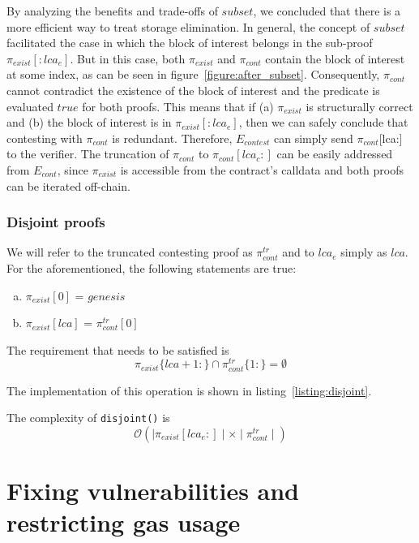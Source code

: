 By analyzing the benefits and trade-offs of $subset$, we concluded that there
is a more efficient way to treat storage elimination. In general, the concept
of $subset$ facilitated the case in which the block of interest belongs in the
sub-proof $\pi_{exist}[:lca_{e}]$. But in this case, both $\pi_{exist}$ and
$\pi_{cont}$ contain the block of interest at some index, as can be seen in
figure~\ref{figure:after_subset}. Consequently, $\pi_{cont}$ cannot contradict
the existence of the block of interest and the predicate is evaluated $true$
for both proofs. This means that if (a) $\pi_{exist}$ is structurally correct
and (b) the block of interest is in $\pi_{exist}[:lca_{e}]$, then we can safely
conclude that contesting with $\pi_{cont}$ is redundant. Therefore,
$E_{contest}$ can simply send $\pi_{cont}$[lca:] to the verifier. The
truncation of $\pi_{cont}$ to $\pi_{cont}[lca_{c}:]$ can be easily addressed
from $E_{cont}$, since $\pi_{exist}$ is accessible from the contract's
calldata and both proofs can be iterated off-chain.

\newcommand*{\exist}{$\pi_{exist}$}
\newcommand*{\cont}{$\pi_{cont}^{tr}$}

\subsubsection{Disjoint proofs}

We will refer to the truncated contesting proof as $\pi_{cont}^{tr}$ and to
$lca_{e}$ simply as $lca$. For the aforementioned, the following statements are
true:

\begin{enumerate}[(a)]
    \item  $\pi_{exist}[0]$ = $genesis$
    \item  $\pi_{exist}[lca]$ = $\pi_{cont}^{tr}[0]$
\end{enumerate}

The requirement that needs to be satisfied is
\[\pi_{exist}\{lca+1:\} \cap \pi_{cont}^{tr}\{1:\} = \emptyset \]

The implementation of this operation is shown in
listing~\ref{listing:disjoint}.



The complexity of \texttt{disjoint()} is
\[ \mathcal{O}(\mid\pi_{exist}[lca_{e}:]\mid \times
\mid\pi_{cont}^{tr}\mid) \]

\section{Fixing vulnerabilities and restricting gas usage}

%
%
